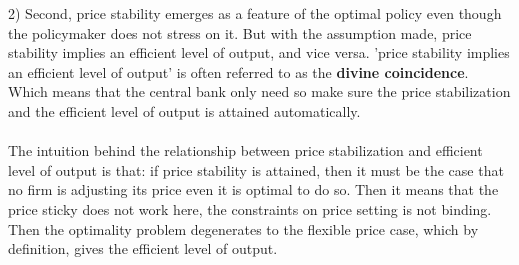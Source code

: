 \documentclass{article}
\numberwithin{equation}{section}
\begin{document}
2) Second, price stability emerges as a feature of the optimal policy even though the policymaker does not stress on it. But with the assumption made, price stability implies an efficient level of output, and vice versa. 'price stability implies an efficient level of output' is often referred to as the \textbf{divine coincidence}. Which means that the central bank only need so make sure the price stabilization and the efficient level of output is attained automatically.\\\\
The intuition behind the relationship between price stabilization and efficient level of output is that: if price stability is attained, then it must be the case that no firm is adjusting its price even it is optimal to do so. Then it means that the price sticky does not work here, the constraints on price setting is not binding. Then the optimality problem degenerates to the flexible price case, which by definition, gives the efficient level of output.
\end{document}
